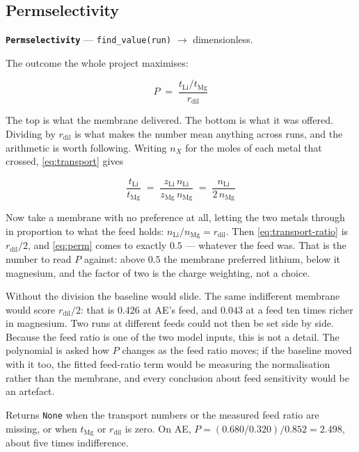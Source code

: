 \subsection{Permselectivity}

\textbf{\texttt{Permselectivity}} --- \texttt{find\_value(run)} $\rightarrow$
dimensionless.

The outcome the whole project maximises:

\begin{equation}
  P \;=\; \frac{t_\mathrm{Li} / t_\mathrm{Mg}}{r_\mathrm{dil}}
  \label{eq:perm}
\end{equation}

The top is what the membrane delivered. The bottom is what it was offered. Dividing by
$r_\mathrm{dil}$ is what makes the number mean anything across runs, and the arithmetic is worth
following. Writing $n_X$ for the moles of each metal that crossed, \eqref{eq:transport} gives

\begin{equation}
  \frac{t_\mathrm{Li}}{t_\mathrm{Mg}} \;=\;
  \frac{z_\mathrm{Li}\,n_\mathrm{Li}}{z_\mathrm{Mg}\,n_\mathrm{Mg}} \;=\;
  \frac{n_\mathrm{Li}}{2\,n_\mathrm{Mg}}
  \label{eq:transport-ratio}
\end{equation}

Now take a membrane with no preference at all, letting the two metals through in proportion to
what the feed holds: $n_\mathrm{Li}/n_\mathrm{Mg} = r_\mathrm{dil}$. Then
\eqref{eq:transport-ratio} is $r_\mathrm{dil}/2$, and \eqref{eq:perm} comes to exactly $0.5$ ---
whatever the feed was. That is the number to read $P$ against: above $0.5$ the membrane preferred
lithium, below it magnesium, and the factor of two is the charge weighting, not a choice.

Without the division the baseline would slide. The same indifferent membrane would score
$r_\mathrm{dil}/2$: that is $0.426$ at AE's feed, and $0.043$ at a feed ten times richer in
magnesium. Two runs at different feeds could not then be set side by side. Because the feed ratio
is one of the two model inputs, this is not a detail. The polynomial is asked how $P$ changes as
the feed ratio moves; if the baseline moved with it too, the fitted feed-ratio term would be
measuring the normalisation rather than the membrane, and every conclusion about feed sensitivity
would be an artefact.

Returns \texttt{None} when the transport numbers or the measured feed ratio are missing, or when
$t_\mathrm{Mg}$ or $r_\mathrm{dil}$ is zero. On AE,
$P = (0.680/0.320)/0.852 = 2.498$, about five times indifference.

